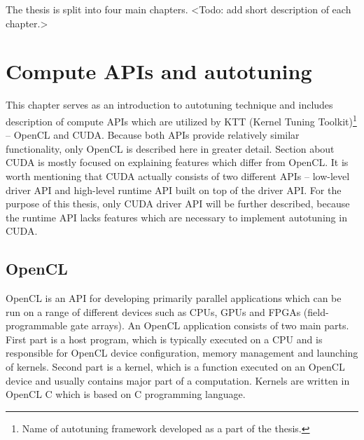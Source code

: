 \documentclass
[
    digital, %
    oneside, %
    table, %
    nolof, %
    nolot, %
    nocover %
]{fithesis3}
\begin{document}
The thesis is split into four main chapters. <Todo: add short description of each chapter.>

\chapter{Compute APIs and autotuning}
This chapter serves as an introduction to autotuning technique and includes description of compute APIs which are utilized by KTT (Kernel Tuning
Toolkit)\footnote{Name of autotuning framework developed as a part of the thesis.} -- OpenCL and CUDA. Because both APIs provide relatively similar
functionality, only OpenCL is described here in greater detail. Section about CUDA is mostly focused on explaining features which differ from OpenCL.
It is worth mentioning that CUDA actually consists of two different APIs -- low-level driver API and high-level runtime API built on top of the driver
API. For the purpose of this thesis, only CUDA driver API will be further described, because the runtime API lacks features which are necessary to
implement autotuning in CUDA.

\section{OpenCL}
OpenCL is an API for developing primarily parallel applications which can be run on a range of different devices such as CPUs, GPUs and FPGAs
(field-programmable gate arrays). An OpenCL application consists of two main parts. First part is a host program, which is typically executed on a CPU
and is responsible for OpenCL device configuration, memory management and launching of kernels. Second part is a kernel, which is a function executed
on an OpenCL device and usually contains major part of a computation. Kernels are written in OpenCL C which is based on C programming language.
\end{document}
